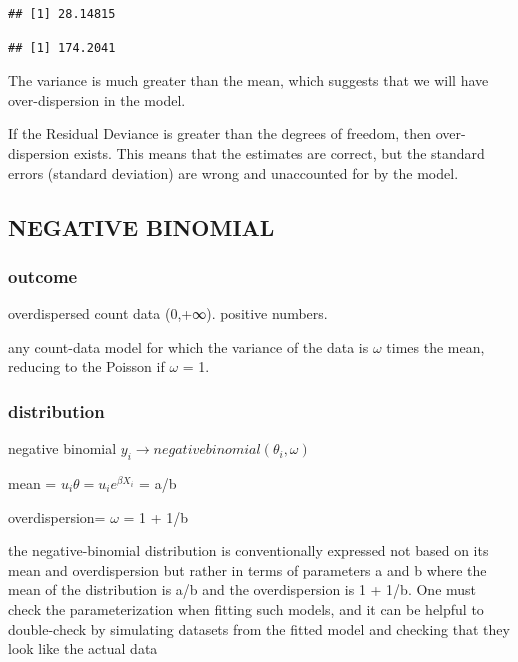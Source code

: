 \documentclass[
]{article}
\newenvironment{Shaded}{\begin{snugshade}}{\end{snugshade}}
\newcommand{\KeywordTok}[1]{\textcolor[rgb]{0.13,0.29,0.53}{\textbf{#1}}}
\newcommand{\NormalTok}[1]{#1}
\newcommand{\OperatorTok}[1]{\textcolor[rgb]{0.81,0.36,0.00}{\textbf{#1}}}
\begin{document}
\begin{verbatim}
## [1] 28.14815
\end{verbatim}

\begin{Shaded}
\end{Shaded}

\begin{verbatim}
## [1] 174.2041
\end{verbatim}

The variance is much greater than the mean, which suggests that we will
have over-dispersion in the model.

If the Residual Deviance is greater than the degrees of freedom, then
over-dispersion exists. This means that the estimates are correct, but
the standard errors (standard deviation) are wrong and unaccounted for
by the model.

\hypertarget{negative-binomial}{%
\subsection{NEGATIVE BINOMIAL}\label{negative-binomial}}

\hypertarget{outcome-3}{%
\subsubsection{outcome}\label{outcome-3}}

overdispersed count data (0,+∞). positive numbers.

any count-data model for which the variance of the data is \(\omega\)
times the mean, reducing to the Poisson if \(\omega\) = 1.

\hypertarget{distribution-3}{%
\subsubsection{distribution}\label{distribution-3}}

negative binomial \(y_i \to negative binomial (\theta_i, \omega)\)

mean = \(u_i\theta= u_ie^{\beta X_i}\) = a/b

overdispersion= \(\omega\) = 1 + 1/b

the negative-binomial distribution is conventionally expressed not based
on its mean and overdispersion but rather in terms of parameters a and b
where the mean of the distribution is a/b and the overdispersion is 1 +
1/b. One must check the parameterization when fitting such models, and
it can be helpful to double-check by simulating datasets from the fitted
model and checking that they look like the actual data
\end{document}
